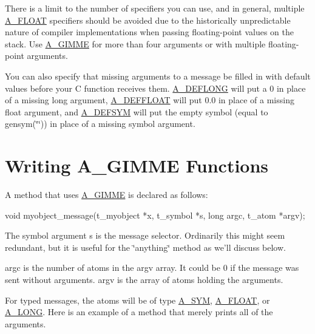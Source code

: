 There is a limit to the number of specifiers you can use, and in general, multiple \hyperlink{group__atom_gga8aa6700e9f00b132eb376db6e39ade47a0b3aa0ab8104573dfc9cb70b5b08031f}{A\_\-FLOAT} specifiers should be avoided due to the historically unpredictable nature of compiler implementations when passing floating-\/point values on the stack. Use \hyperlink{group__atom_gga8aa6700e9f00b132eb376db6e39ade47a81c1a8550f038db16a619167a70a79b6}{A\_\-GIMME} for more than four arguments or with multiple floating-\/point arguments.

You can also specify that missing arguments to a message be filled in with default values before your C function receives them. \hyperlink{group__atom_gga8aa6700e9f00b132eb376db6e39ade47a7bd979db3dcf86909e24a1d1452e2205}{A\_\-DEFLONG} will put a 0 in place of a missing long argument, \hyperlink{group__atom_gga8aa6700e9f00b132eb376db6e39ade47a42b644240dcbb90fe67282a4d0688776}{A\_\-DEFFLOAT} will put 0.0 in place of a missing float argument, and \hyperlink{group__atom_gga8aa6700e9f00b132eb376db6e39ade47aa010616276cb89bcd04bcba611e18d51}{A\_\-DEFSYM} will put the empty symbol (equal to gensym(\char`\"{}\char`\"{})) in place of a missing symbol argument.\hypertarget{chapter_atoms_chapter_atoms_gimme_funcs}{}\section{Writing A\_\-GIMME Functions}\label{chapter_atoms_chapter_atoms_gimme_funcs}
A method that uses \hyperlink{group__atom_gga8aa6700e9f00b132eb376db6e39ade47a81c1a8550f038db16a619167a70a79b6}{A\_\-GIMME} is declared as follows: 
\begin{DoxyCode}
    void myobject_message(t_myobject *x, t_symbol *s, long argc, t_atom *argv);
\end{DoxyCode}


The symbol argument s is the message selector. Ordinarily this might seem redundant, but it is useful for the \char`\"{}anything\char`\"{} method as we'll discuss below.

argc is the number of atoms in the argv array. It could be 0 if the message was sent without arguments. argv is the array of atoms holding the arguments.

For typed messages, the atoms will be of type \hyperlink{group__atom_gga8aa6700e9f00b132eb376db6e39ade47a2d661c2a5d949566e2f1944c99bceeea}{A\_\-SYM}, \hyperlink{group__atom_gga8aa6700e9f00b132eb376db6e39ade47a0b3aa0ab8104573dfc9cb70b5b08031f}{A\_\-FLOAT}, or \hyperlink{group__atom_gga8aa6700e9f00b132eb376db6e39ade47a002f28879581a6f66ea492b994b96f1e}{A\_\-LONG}. Here is an example of a method that merely prints all of the arguments.


